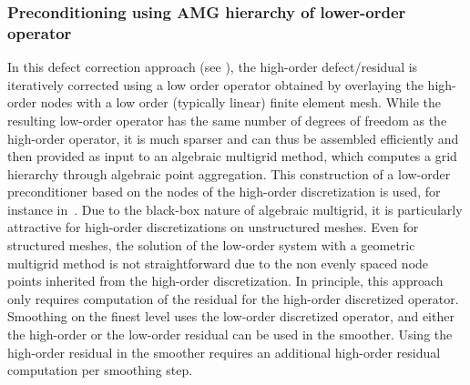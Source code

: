 \documentclass[smallcondensed,final]{svjour3}     %
\newcommand{\gsnote}[1]{\textcolor{blue}{GS: #1}}
\begin{document}
\subsubsection{Preconditioning using AMG hierarchy of lower-order operator} \label{subsec:low}
In this defect correction approach (see
\cite{TrottenbergOosterleeSchuller01, Hackbusch85}), the high-order
defect/residual is iteratively corrected using a low order operator
obtained by overlaying the high-order nodes with a low order
(typically linear) finite element mesh. While the resulting low-order
operator has the same number of degrees of freedom as the high-order
operator, it is much sparser and can thus be assembled efficiently and
then provided as input to an algebraic multigrid method, which
computes a grid hierarchy through algebraic point aggregation.  This
construction of a low-order preconditioner based on the nodes of the
high-order discretization is used, for instance in~\cite{Brown10,
  Kim07, DevilleMund90, HeysManteuffelMcCormickEtAl05}.  Due to the
black-box nature of algebraic multigrid, it is particularly attractive
for high-order discretizations on unstructured meshes.  Even for
structured meshes, the solution of the low-order system with a
geometric multigrid method is not straightforward due to the non
evenly spaced node points inherited from the high-order
discretization.  In principle, this approach only requires computation
of the residual for the high-order discretized operator. Smoothing on
the finest level uses the low-order discretized operator, and either
the high-order or the low-order residual can be used in the
smoother. Using the high-order residual in the smoother requires an
additional high-order residual computation per smoothing step.




\end{document}
